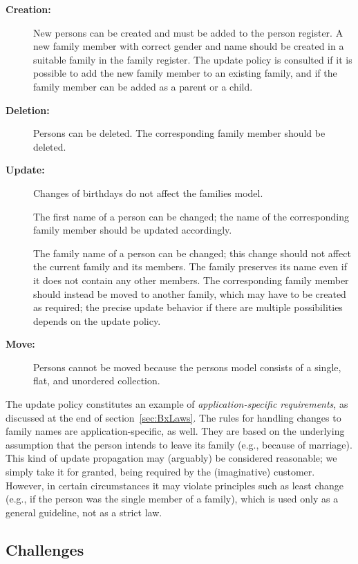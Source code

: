 \begin{description}
    \item[\textbf{Creation:}]
    New persons can be created and must be added to the person register.
    A new family member with correct gender and name should be created in a suitable family in the family register.
    The update policy is consulted if it is possible to add the new family member to an existing family, and if the family member can be added as a parent or a child.
    
    \item[\textbf{Deletion:}]
    Persons can be deleted.
    The corresponding family member should be deleted. 

    \item[\textbf{Update:}]
    Changes of birthdays do not affect the families model. 

    The first name of a person can be changed; 
    the name of the corresponding family member should be updated accordingly. 

    The family name of a person can be changed; 
    this change should not affect the current family and its members.
    The family preserves its name even if it does not contain any other members.
    The corresponding family member should instead be moved to another family, which may have to be created as required; the precise update behavior if there are multiple possibilities depends on the update policy.
    
    \item[\textbf{Move:}]
    Persons cannot be moved because the persons model consists of a single, flat, and unordered collection. 
\end{description}

The update policy constitutes an example of \emph{ap\-pli\-ca\-tion-specific requirements}, as discussed at the end of section~\ref{sec:BxLaws}. The rules for handling changes to family names are application-specific, as well. They are based on the underlying assumption that the person intends to leave its family (e.g., because of marriage). This kind of update propagation may (arguably) be considered reasonable; we simply take it for granted, being required by the (imaginative) customer. However, in certain circumstances it may violate principles such as least change (e.g., if the person was the single member of a family), which is used only as a general guideline, not as a strict law. 


\subsection{Challenges}
\label{sec:Challenges}


